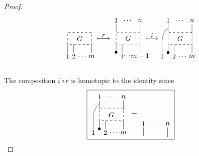 \begin{proof}
\begin{equation*}
{\begin{tikzpicture}[scale=.6]
		\draw [dashed] (0,0) rectangle (2,1); \node at (1, .5) {$G$};
		
		\draw (0,-.7) -- (0,0);
		\node at (0,-1) {$1$};
		\node at (.5,-1) {$2$}; \draw (.5,-.7) -- (.5,0);
		\node at (1.25,-1) {$\dots$};
		\node at (2,-1) {$m$}; \draw (2,-.7) -- (2,0);
		
		\node at (3,.75) {$r$}; \draw [|->] (2.5,.5) -- (3.5,.5);
		\end{tikzpicture}
		\   %
		\begin{tikzpicture}[scale=.6]
		\node at (0,2) {$1$}; \draw (0,1.7) -- (0,1);
		\node at (1,2) {$\dots$};
		\node at (2,2) {$n$}; \draw (2,1.7) -- (2,.9);
		
		\draw [dashed] (0,0) rectangle (2,1); \node at (1, .5) {$G$};
		
		\node at(0,-.7) {$\bullet$}; \draw (0,-.7) -- (0,0);
		\node at (.5,-1) {$1$}; \draw (.5,-.7) -- (.5,0);
		\node at (.9,-1) {$\cdot\!\cdot\!\cdot$};
		\node at (2,-1) {$m-1$}; \draw (2,-.7) -- (2,0);
		
		\node at (3,.75) {$i$}; \draw [|->] (2.5,.5) -- (3.5,.5);
		\end{tikzpicture}
		\begin{tikzpicture}[scale=.6]
		\node at (0,2) {$1$}; \draw (0,1.7) -- (0,1);
		\node at (1,2) {$\dots$};
		\node at (2,2) {$n$}; \draw (2,1.7) -- (2,.9);
		
		\draw [dashed] (0,0) rectangle (2,1); \node at (1, .5) {$G$};
		
		\node at (-.5,-1) {$1$}; \draw (-.5,-.7)  to[out=90,in=-140]  (0,1.4);
		\node at (0,-.7) {$\bullet$}; \draw (0,-.7) -- (0,0);
		\node at (.5,-1) {$2$}; \draw (.5,-.7) -- (.5,0);
		\node at (1.25,-1) {$\dots$};
		\node at (2,-1) {$m$}; \draw (2,-.7) -- (2,0);
		\end{tikzpicture}
	}
	\end{equation*}\\
	The composition $i \circ r$ is homotopic to the identity since
	\begin{equation*}
	\boxed{
		\begin{tikzpicture}[scale=.6]
		\node at (0,2) {$1$}; \draw (0,1.7) -- (0,1);
		\node at (1,2) {$\dots$};
		\node at (2,2) {$n$}; \draw (2,1.7) -- (2,.9);
		
		\draw [dashed] (0,0) rectangle (2,1); \node at (1, .5) {$G$};
		
		\node at (-.5,-1) {$1$}; \draw (-.5,-.7)  to[out=90,in=-140]  (0,1.4);
		\node at (0,-.7) {$\bullet$}; \draw (0,-.7) -- (0,0);
		\node at (.5,-1) {$2$}; \draw (.5,-.7) -- (.5,0);
		\node at (1.25,-1) {$\dots$};
		\node at (2,-1) {$m$}; \draw (2,-.7) -- (2,0);
		\node at (2.9,.5) {$=$}; 
		\end{tikzpicture}
		\begin{tikzpicture}[scale=.6]
		\node at (0,2) {$1$}; \draw (0,1.7) -- (0,1);
		\node at (1,2) {$\dots$};
		\node at (2,2) {$n$}; \draw (2,1.7) -- (2,.9);
		

\end{tikzpicture}}
\end{equation*}
\end{proof}
